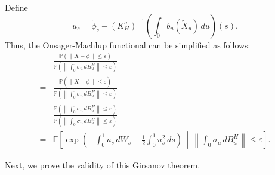 \documentclass[preprint,12pt]{elsarticle}
\theoremstyle{definition}  %
\theoremstyle{plain}  %
\begin{document}
Define
\begin{equation}
    u_s = \dot{\phi}_s - (K_H^\sigma)^{-1}\left( \int_0^\cdot b_u(\tilde{X}_u) \, du \right)(s).
\end{equation}
Thus, the Onsager-Machlup functional can be simplified as follows:  
\[
\begin{aligned}
&\frac{\mathbb{P}(\|X - \phi\| \leq \varepsilon)}{\mathbb{P}\left( \left\| \int_0^\cdot \sigma_u \, dB^H_u \right\| \leq \varepsilon \right)} \\
=& \frac{\tilde{\mathbb{P}}(\| \tilde{X} - \phi \| \leq \varepsilon)}{\mathbb{P}\left( \left\| \int_0^\cdot \sigma_u \, dB^H_u \right\| \leq \varepsilon \right)} \\
=& \frac{\tilde{\mathbb{P}}\left( \left\| \int_0^\cdot \sigma_u \, dB^H_u \right\| \leq \varepsilon \right)}{\mathbb{P}\left( \left\| \int_0^\cdot \sigma_u \, dB^H_u \right\| \leq \varepsilon \right)} \\
=& \mathbb{E} \left[ \exp \left( -\int_0^1 u_s \, dW_s - \frac{1}{2} \int_0^1 u_s^2 \, ds \right) \,\middle|\, \left\| \int_0^\cdot \sigma_u \, dB^H_u \right\| \leq \varepsilon  \right].
\end{aligned}
\]


Next, we prove the validity of this Girsanov theorem.
\end{document}
